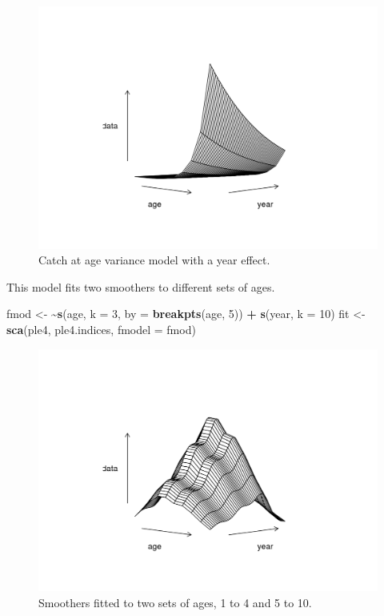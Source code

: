 \documentclass[
]{book}
\newenvironment{Shaded}{\begin{snugshade}}{\end{snugshade}}
\newcommand{\AttributeTok}[1]{\textcolor[rgb]{0.13,0.29,0.53}{#1}}
\newcommand{\DecValTok}[1]{\textcolor[rgb]{0.00,0.00,0.81}{#1}}
\newcommand{\ErrorTok}[1]{\textcolor[rgb]{0.64,0.00,0.00}{\textbf{#1}}}
\newcommand{\FunctionTok}[1]{\textcolor[rgb]{0.13,0.29,0.53}{\textbf{#1}}}
\newcommand{\NormalTok}[1]{#1}
\newcommand{\OtherTok}[1]{\textcolor[rgb]{0.56,0.35,0.01}{#1}}
\newcommand{\SpecialCharTok}[1]{\textcolor[rgb]{0.81,0.36,0.00}{\textbf{#1}}}
\begin{document}
\begin{figure}
\centering
\includegraphics{_bookdown_files/_main_files/figure-html/vm-1.png}
\caption{\label{fig:vm}Catch at age variance model with a year effect.}
\end{figure}

This model fits two smoothers to different sets of ages.

\begin{Shaded}
\begin{Highlighting}[]
\NormalTok{fmod }\OtherTok{\textless{}{-}} \ErrorTok{\textasciitilde{}}\FunctionTok{s}\NormalTok{(age, }\AttributeTok{k =} \DecValTok{3}\NormalTok{, }\AttributeTok{by =} \FunctionTok{breakpts}\NormalTok{(age, }\DecValTok{5}\NormalTok{)) }\SpecialCharTok{+} \FunctionTok{s}\NormalTok{(year, }\AttributeTok{k =} \DecValTok{10}\NormalTok{)}
\NormalTok{fit }\OtherTok{\textless{}{-}} \FunctionTok{sca}\NormalTok{(ple4, ple4.indices, }\AttributeTok{fmodel =}\NormalTok{ fmod)}
\end{Highlighting}
\end{Shaded}

\begin{figure}
\centering
\includegraphics{_bookdown_files/_main_files/figure-html/danai01-1.png}
\caption{\label{fig:danai01}Smoothers fitted to two sets of ages, 1 to 4 and 5 to 10.}
\end{figure}
\end{document}
